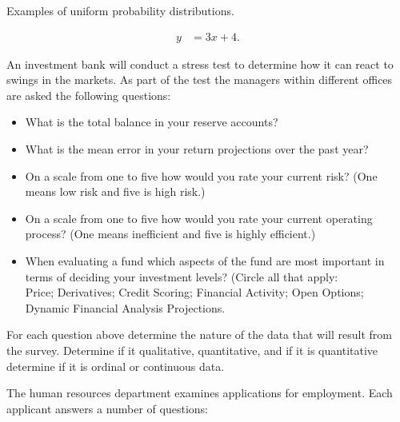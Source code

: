

\begin{problem}
\item Examples of uniform probability distributions.

  \begin{subproblem}
  \item 
    \begin{eqnarray}
      y & = 3x + 4.
    \end{eqnarray}
    \vfill
  \end{subproblem}


\end{problem}




\begin{problem}

\item An investment bank will conduct a stress test to determine how
  it can react to swings in the markets. As part of the test the
  managers within different offices are asked the following questions:
  \begin{itemize}
  \item What is the total balance in your reserve accounts?
  \item What is the mean error in your return projections over the
    past year?
  \item On a scale from one to five how would you rate your current
    risk? (One means low risk and five is high risk.)
  \item On a scale from one to five how would you rate your current
    operating process? (One means inefficient and five is highly
    efficient.)
  \item When evaluating a fund which aspects of the fund are most
    important in terms of deciding your investment levels? (Circle all
    that apply: \\
    Price; Derivatives; Credit Scoring; Financial Activity; Open
    Options; Dynamic Financial Analysis Projections.
  \end{itemize}

  For each question above determine the nature of the data that will
  result from the survey. Determine if it qualitative, quantitative,
  and if it is quantitative determine if it is ordinal or continuous
  data.

  \vfill

  \clearpage

\item The human resources department examines applications for
  employment. Each applicant answers a number of questions:


\end{problem}
